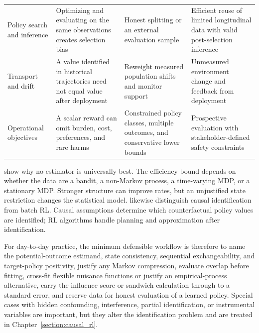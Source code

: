 \begin{table}[htbp]
{\begin{tabularx}{\textwidth}{p{} p{} p{} >{\raggedright\arraybackslash}X}
Policy search and inference & Optimizing and evaluating on the same observations creates selection bias & Honest splitting or an external evaluation sample & Efficient reuse of limited longitudinal data with valid post-selection inference \citep{ueharaShiKallus2022ope, jaman2025postselectiong} \\
Transport and drift & A value identified in historical trajectories need not equal value after deployment & Reweight measured population shifts and monitor support & Unmeasured environment change and feedback from deployment \\
Operational objectives & A scalar reward can omit burden, cost, preferences, and rare harms & Constrained policy classes, multiple outcomes, and conservative lower bounds & Prospective evaluation with stakeholder-defined safety constraints \citep{laber2014dtrchallenges, liaoMurphy2021longterm} \\
\bottomrule
\end{tabularx}
}
\end{table}

\citet{ueharaShiKallus2022ope} show why no estimator is universally best. The efficiency bound depends on whether the data are a bandit, a non-Markov process, a time-varying MDP, or a stationary MDP. Stronger structure can improve rates, but an unjustified state restriction changes the statistical model. \citet{bannon2020causality} likewise distinguish causal identification from batch RL. Causal assumptions determine which counterfactual policy values are identified; RL algorithms handle planning and approximation after identification.

For day-to-day practice, the minimum defensible workflow is therefore to name the potential-outcome estimand, state consistency, sequential exchangeability, and target-policy positivity, justify any Markov compression, evaluate overlap before fitting, cross-fit flexible nuisance functions or justify an empirical-process alternative, carry the influence score or sandwich calculation through to a standard error, and reserve data for honest evaluation of a learned policy. Special cases with hidden confounding, interference, partial identification, or instrumental variables are important, but they alter the identification problem and are treated in Chapter~\ref{section:causal_rl}.

